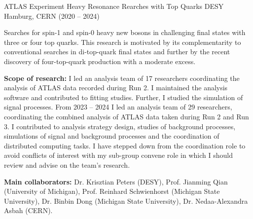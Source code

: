 \begin{cventries}
\cventry
{ATLAS Experiment} %
{Heavy Resonance Rearches with Top Quarks} %
{DESY Hamburg, CERN} %
{(2020 – 2024)} %
{
  \begin{cvitems} %
    \item {Searches for spin-1 and spin-0 heavy new bosons in challenging final states with three or four top quarks. This research is motivated by its complementarity to conventional searches in di-top-quark final states and further by the recent discovery of four-top-quark production with a moderate excess.}
    \item \textbf{Scope of research:} I led an analysis team of 17 researchers coordinating the analysis of
    ATLAS data recorded during Run 2. I maintained the analysis software and contributed to fitting studies. Further, I studied the simulation of signal processes. From 2023 – 2024 I led
    an analysis team of 29 researchers, coordinating the combined analysis of ATLAS data taken
    during Run 2 and Run 3. I contributed to analysis strategy design, studies of background
    processes, simulations of signal and background processes and the coordination of distributed
    computing tasks. I have stepped down from the coordination role to avoid conflicts of interest
    with my sub-group convene role in which I should review and advise on the team's research.
    \item \textbf{Main collaborators:} Dr. Krisztian Peters (DESY), Prof. Jianming Qian (University of Michigan), Prof. Reinhard Schwienhorst (Michigan State University), Dr. Binbin Dong (Michigan State University), Dr. Nedaa-Alexandra Asbah (CERN).
  \end{cvitems}
}


\end{cventries}
